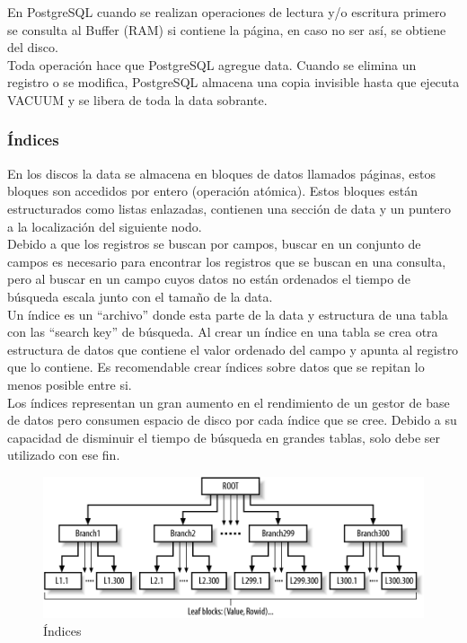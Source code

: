 En PostgreSQL cuando se realizan operaciones de lectura y/o escritura primero se consulta al Buffer (RAM) si contiene la página, en caso no ser así, se obtiene del disco.\\

Toda operación hace que PostgreSQL agregue data. Cuando se elimina un registro o se modifica, PostgreSQL almacena una copia invisible hasta que ejecuta VACUUM y se libera de toda la data sobrante.\\

\subsubsection{Índices}

En los discos la data se almacena en bloques de datos llamados páginas, estos bloques son accedidos por entero (operación atómica). Estos bloques están estructurados como listas enlazadas, contienen una sección de data y un puntero a la localización del siguiente nodo. \\

Debido a que los registros se buscan por campos, buscar en un conjunto de campos es necesario para encontrar los registros que se buscan en una consulta, pero al buscar en un campo cuyos datos no están ordenados el tiempo de búsqueda escala junto con el tamaño de la data.\\

Un índice es un “archivo” donde esta parte de la data y estructura de una tabla con las “search key” de búsqueda. Al crear un índice en una tabla se crea otra estructura de datos que contiene el valor ordenado del campo y apunta al registro que lo contiene. Es recomendable crear índices sobre datos que se repitan lo menos posible entre si.\\

Los índices representan un gran aumento en el rendimiento de un gestor de base de datos pero consumen espacio de disco por cada índice que se cree. Debido a su capacidad de disminuir el tiempo de búsqueda en grandes tablas, solo debe ser utilizado con ese fin. \\

\begin{figure}[ht!]
   \centering
   \includegraphics[scale=0.5]{imagenes/index.png}
   \caption{Índices}\label{graf:indice}
\end{figure}

